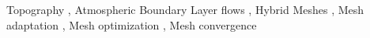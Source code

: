 \documentclass[1p]{elsarticle}
\begin{document}
\begin{frontmatter}



\begin{keyword}
Topography
\sep 
Atmospheric Boundary Layer flows
\sep 
Hybrid Meshes
\sep 
Mesh adaptation
\sep 
Mesh optimization
\sep 
Mesh convergence
\end{keyword} 

\end{frontmatter}
\end{document}
